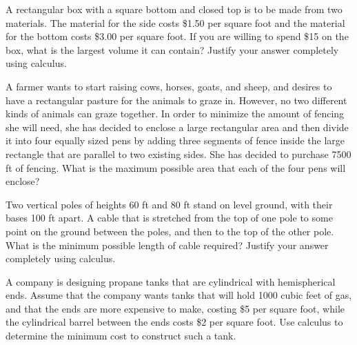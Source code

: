 \begin{exercises} 
	\item A rectangular box with a square bottom and closed top is to be made from two materials.  The material for the side costs \$1.50 per square foot and the material for the bottom costs \$3.00 per square foot.  If you are willing to spend \$15 on the box, what is the largest volume it can contain?  Justify your answer completely using calculus.
	\item A farmer wants to start raising cows, horses, goats, and sheep, and desires to have a rectangular pasture for the animals to graze in.  However, no two different kinds of animals can graze together.  In order to minimize the amount of fencing she will need, she has decided to enclose a large rectangular area and then divide it into four equally sized pens by adding three segments of fence inside the large rectangle that are parallel to two existing sides.  She has decided to purchase 7500 ft of fencing.  What is the maximum possible area that each of the four pens will enclose?
	\item Two vertical poles of heights 60 ft and 80 ft stand on level ground, with their bases 100 ft apart.  A cable that is stretched from the top of one pole to some point on the ground between the poles, and then to the top of the other pole.   What is the minimum possible length of cable required?  Justify your answer completely using calculus.
	\item A company is designing propane tanks that are cylindrical with hemispherical ends.   Assume that the company wants tanks that will hold 1000 cubic feet of gas, and that the ends are more expensive to make, costing \$5 per square foot, while the cylindrical barrel between the ends costs \$2 per square foot.  Use calculus to determine the minimum cost to construct such a tank.
\end{exercises}
\afterexercises